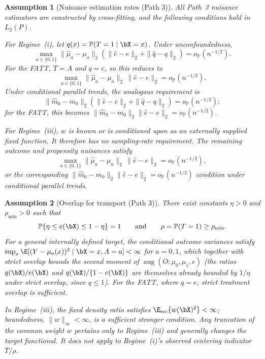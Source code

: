 \documentclass{article}
\newtheorem{assumption}{Assumption}
\renewcommand{\P}{\mathbb{P}}
\begin{document}
\begin{assumption}[Nuisance estimation rates (Path 3)]\label{RC8}
All Path~3 nuisance estimators are constructed by cross-fitting, and the following conditions hold in $L_2(P)$.

For Regime~(i), let $q(x)=\P(T=1\mid\bX=x)$. Under unconfoundedness,
\[
\max_{a\in\{0,1\}}
\|\widehat\mu_a-\mu_a\|_2
\left(
\|\widehat e-e\|_2+\|\widehat q-q\|_2
\right)
=
o_{\P}(n^{-1/2}).
\]
For the FATT, $T=A$ and $q=e$, so this reduces to
\[
\max_{a\in\{0,1\}}
\|\widehat\mu_a-\mu_a\|_2
\,
\|\widehat e-e\|_2
=
o_{\P}(n^{-1/2}).
\]
Under conditional parallel trends, the analogous requirement is
\[
\|\widehat m_0-m_0\|_2
\left(
\|\widehat e-e\|_2+\|\widehat q-q\|_2
\right)
=
o_{\P}(n^{-1/2});
\]
for the FATT, this becomes
$\|\widehat m_0-m_0\|_2\|\widehat e-e\|_2
=o_{\P}(n^{-1/2})$.

For Regime~(iii), $w$ is known or is conditioned upon as an externally supplied fixed function. It therefore has no sampling-rate requirement. The remaining outcome and propensity nuisances satisfy
\[
\max_{a\in\{0,1\}}
\|\widehat\mu_a-\mu_a\|_2
\,
\|\widehat e-e\|_2
=
o_{\P}(n^{-1/2}),
\]
or the corresponding
$\|\widehat m_0-m_0\|_2\|\widehat e-e\|_2
=o_{\P}(n^{-1/2})$
condition under conditional parallel trends.
\end{assumption}

\begin{assumption}[Overlap for transport (Path 3)]\label{RC9}
There exist constants $\eta>0$ and $\rho_{\min}>0$ such that
\[
\P\{\eta\leq e(\bX)\leq1-\eta\}=1
\qquad\text{and}\qquad
\rho=\P(T=1)\geq\rho_{\min}.
\]
For a general internally defined target, the conditional outcome variances satisfy $\sup_x\E[(Y-\mu_a(x))^2\mid\bX=x,A=a]<\infty$ for $a=0,1$, which together with strict overlap bounds the second moment of $\operatorname{aug}(O;\mu_0,\mu_1,e)$ (the ratios $q(\bX)/e(\bX)$ and $q(\bX)/\{1-e(\bX)\}$ are themselves already bounded by $1/\eta$ under strict overlap, since $q\leq1$). For the FATT, where $q=e$, strict treatment overlap is sufficient.

In Regime~(iii), the fixed density ratio satisfies
$\E_{\mathrm{src}}\{w(\bX)^2\}<\infty$; boundedness,
$\|w\|_\infty<\infty$, is a sufficient stronger condition. Any truncation of the common weight $w$ pertains only to Regime~(iii) and generally changes the target functional. It does not apply to Regime~(i)'s observed centering indicator $T/\rho$.
\end{assumption}
\end{document}
